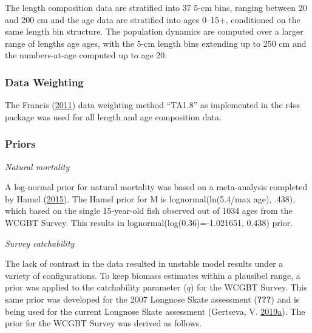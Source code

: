 \documentclass[12pt,]{article}
\begin{document}
The length composition data are stratified into 37 5-cm bins, ranging
between 20 and 200 cm and the age data are stratified into ages 0--15+,
conditioned on the same length bin structure. The population dynamics
are computed over a larger range of lengths age ages, with the 5-cm
length bins extending up to 250 cm and the numbers-at-age computed up to
age 20.

\hypertarget{data-weighting}{%
\subsubsection{Data Weighting}\label{data-weighting}}

The Francis (\protect\hyperlink{ref-Francis2011}{2011}) data weighting
method ``TA1.8'' as implemented in the r4ss package was used for all
length and age composition data.

\hypertarget{priors}{%
\subsubsection{Priors}\label{priors}}

\emph{Natural mortality}

A log-normal prior for natural mortality was based on a meta-analysis
completed by Hamel (\protect\hyperlink{ref-Hamel2015}{2015}). The Hamel
prior for M is lognormal(ln(5.4/max age), .438), which based on the
single 15-year-old fish observed out of 1034 ages from the WCGBT Survey.
This results in lognormal(log(0.36)=-1.021651, 0.438) prior.

\vspace{.5cm}

\emph{Survey catchability}

The lack of contrast in the data resulted in unstable model results
under a variety of configurations. To keep biomass estimates within a
plausibel range, a prior was applied to the catchability parameter
(\(q\)) for the WCGBT Survey. This same prior was developed for the 2007
Longnose Skate assessment ({\textbf{???}}) and is being used for the
current Longnose Skate assessment (Gertseva, V.
\protect\hyperlink{ref-Gertseva2019}{2019}\protect\hyperlink{ref-Gertseva2019}{a}).
The prior for the WCGBT Survey was derived as follows.
\end{document}
